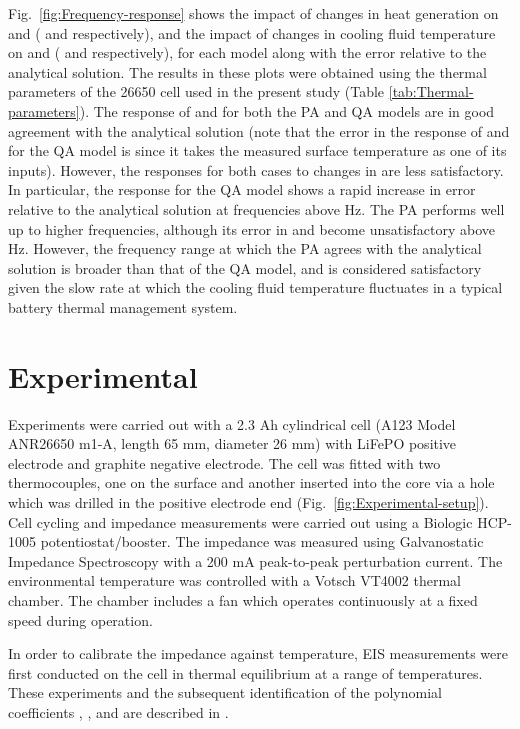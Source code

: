 \documentclass[journal, english]{IEEEtran}
\begin{document}
Fig.\ \ref{fig:Frequency-response} shows  the impact of changes in heat generation on 
  and  ( and 
respectively), and the impact of changes in cooling fluid temperature  on 
and  ( and \textbf{}
respectively), for each model along with the error relative to the
analytical solution.
The results in these plots were obtained using the thermal parameters of the 26650 cell used  in the present study (Table \ref{tab:Thermal-parameters}).
The response of  and 
for both the PA and QA models are in good agreement with the analytical
solution (note that the error in the response of 
and  for the QA model is  since it takes the
measured surface temperature as one of its inputs). However, the responses
for both cases to changes in  are less satisfactory.
In particular, the response  for the QA model shows
a rapid increase in error relative to the analytical solution at frequencies
above  Hz. The PA performs well up to higher frequencies,
although its error in  and  become
unsatisfactory above  Hz. However, the frequency range
at which the PA agrees with the analytical solution is broader than
that of the QA model, and is considered satisfactory given the slow
rate at which the cooling fluid temperature fluctuates in a typical battery thermal
management system.

\section{Experimental}
Experiments were carried out with a 2.3 Ah cylindrical cell (A123
Model ANR26650 m1-A, length 65 mm, diameter 26 mm) with LiFePO positive electrode and graphite negative electrode.
The cell was fitted with two thermocouples, one on the surface and
another inserted into the core via a hole which was drilled in the
positive electrode end (Fig.\ \ref{fig:Experimental-setup}). Cell
cycling and impedance measurements were carried out using a Biologic
HCP-1005 potentiostat/booster. The impedance was measured using Galvanostatic
Impedance Spectroscopy with a 200 mA peak-to-peak perturbation
current. The environmental temperature was controlled with a Votsch
VT4002 thermal chamber. The chamber includes a fan which operates
continuously at a fixed speed during operation.

In order to calibrate the impedance against temperature, EIS measurements
were first conducted on the cell in thermal equilibrium at a
range of temperatures. These experiments and the subsequent identification
of the polynomial coefficients , , and  are
described in \cite{Richardson2014}.
\end{document}
